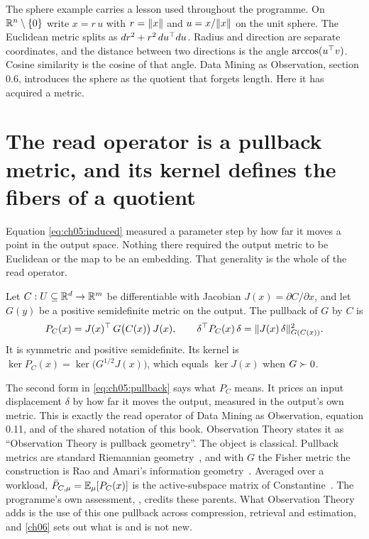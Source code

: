 The sphere example carries a lesson used throughout the programme. On $\mathbb{R}^n\setminus\{0\}$ write $x=r\,u$ with $r=\lVert x\rVert$ and $u=x/\lVert x\rVert$ on the unit sphere. The Euclidean metric splits as $dr^2+r^2\,du^{\top} du$. Radius and direction are separate coordinates, and the distance between two directions is the angle $\arccos(u^{\top} v)$. Cosine similarity is the cosine of that angle. Data Mining as Observation, section 0.6, introduces the sphere as the quotient that forgets length. Here it has acquired a metric.


\section{The read operator is a pullback metric, and its kernel defines the fibers of a quotient}\label{sec:ch05:pullback}

Equation \eqref{eq:ch05:induced} measured a parameter step by how far it moves a point in the output space. Nothing there required the output metric to be Euclidean or the map to be an embedding. That generality is the whole of the read operator.

\begin{definition}\label{def:ch05:pullback}
Let $C:U\subseteq\mathbb{R}^d\to\mathbb{R}^m$ be differentiable with Jacobian $J(x)=\partial C/\partial x$, and let $G(y)$ be a positive semidefinite metric on the output. The pullback of $G$ by $C$ is
\begin{equation}\label{eq:ch05:pullback}
P_C(x)=J(x)^{\top}\,G\big(C(x)\big)\,J(x),\qquad \delta^{\top} P_C(x)\,\delta=\lVert J(x)\,\delta\rVert^2_{G(C(x))}.
\end{equation}
It is symmetric and positive semidefinite. Its kernel is $\ker P_C(x)=\ker\big(G^{1/2}J(x)\big)$, which equals $\ker J(x)$ when $G\succ0$.
\end{definition}

The second form in \eqref{eq:ch05:pullback} says what $P_C$ means. It prices an input displacement $\delta$ by how far it moves the output, measured in the output's own metric. This is exactly the read operator of Data Mining as Observation, equation 0.11, and of the shared notation of this book. Observation Theory states it as ``Observation Theory is pullback geometry''. The object is classical. Pullback metrics are standard Riemannian geometry~\cite{lee2018}, and with $G$ the Fisher metric the construction is Rao and Amari's information geometry~\cite{amari2016}. Averaged over a workload, $\bar P_{C,\mu}=\mathbb{E}_\mu[P_C(x)]$ is the active-subspace matrix of Constantine~\cite{constantine2015}. The programme's own assessment, , credits these parents. What Observation Theory adds is the use of this one pullback across compression, retrieval and estimation, and \cref{ch06} sets out what is and is not new.

